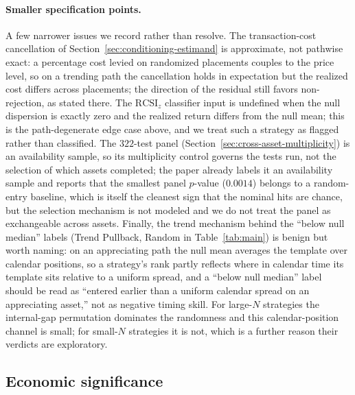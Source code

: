\documentclass[preprint,12pt]{elsarticle}
\theoremstyle{definition}
\begin{document}
\paragraph{Smaller specification points.} A few narrower issues we record rather than
resolve. The transaction-cost cancellation of Section~\ref{sec:conditioning-estimand}
is approximate, not pathwise exact: a percentage cost levied on randomized placements
couples to the price level, so on a trending path the cancellation holds in expectation
but the realized cost differs across placements; the direction of the residual still
favors non-rejection, as stated there. The $\mathrm{RCSI}_z$ classifier input is
undefined when the null dispersion is exactly zero and the realized return differs from
the null mean; this is the path-degenerate edge case above, and we treat such a
strategy as flagged rather than classified. The $322$-test panel
(Section~\ref{sec:cross-asset-multiplicity}) is an availability sample, so its multiplicity
control governs the tests run, not the selection of which assets completed; the paper
already labels it an availability sample and reports that the smallest panel $p$-value
($0.0014$) belongs to a random-entry baseline, which is itself the cleanest sign that
the nominal hits are chance, but the selection mechanism is not modeled and we do not
treat the panel as exchangeable across assets. Finally, the trend mechanism behind the
``below null median'' labels (Trend Pullback, Random in Table~\ref{tab:main}) is
benign but worth naming: on an appreciating path the null mean averages the template
over calendar positions, so a strategy's rank partly reflects where in calendar time
its template sits relative to a uniform spread, and a ``below null median'' label
should be read as ``entered earlier than a uniform calendar spread on an appreciating
asset,'' not as negative timing skill. For large-$N$ strategies the internal-gap
permutation dominates the randomness and this calendar-position channel is small; for
small-$N$ strategies it is not, which is a further reason their verdicts are
exploratory.

\subsection{Economic significance}
\label{sec:discussion-economic}
\end{document}
